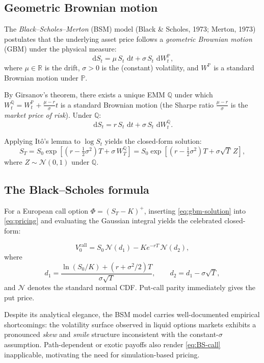 \documentclass[12pt, a4paper]{report}
\theoremstyle{definition}
\newcommand{\Q}{\mathbb{Q}}
\newcommand{\R}{\mathbb{R}}
\newcommand{\dd}{\,\mathrm{d}}
\begin{document}
\subsection{Geometric Brownian motion}

The \emph{Black--Scholes--Merton} (BSM) model (Black \& Scholes, 1973;
Merton, 1973) postulates that the underlying asset price follows a
\emph{geometric Brownian motion} (GBM) under the physical measure:
\[
  \dd S_t = \mu\, S_t\, \dd t + \sigma\, S_t\, \dd W_t^{\mathbb{P}},
\]
where $\mu \in \R$ is the drift, $\sigma > 0$ is the (constant)
volatility, and $W^{\mathbb{P}}$ is a standard Brownian motion under
$\mathbb{P}$.

By Girsanov's theorem, there exists a unique EMM $\Q$ under which
$W_t^{\Q} = W_t^{\mathbb{P}} + \frac{\mu - r}{\sigma}t$ is a standard
Brownian motion (the Sharpe ratio $\frac{\mu-r}{\sigma}$ is the
\emph{market price of risk}).  Under $\Q$:
\[
  \dd S_t = r\, S_t\, \dd t + \sigma\, S_t\, \dd W_t^{\Q}.
\]

Applying Itô's lemma to $\log S_t$ yields the closed-form solution:
\begin{equation}
  S_T = S_0 \exp\!\left[\left(r - \tfrac{1}{2}\sigma^2\right)T
      + \sigma\, W_T^{\Q}\right]
      = S_0 \exp\!\left[\left(r - \tfrac{1}{2}\sigma^2\right)T
      + \sigma\sqrt{T}\,Z\right],
  \label{eq:gbm-solution}
\end{equation}
where $Z \sim \mathcal{N}(0,1)$ under $\Q$.

\subsection{The Black--Scholes formula}

For a European call option $\Phi = (S_T - K)^+$, inserting
\eqref{eq:gbm-solution} into \eqref{eq:pricing} and evaluating the
Gaussian integral yields the celebrated closed-form:

\begin{equation}
  V_0^{\text{call}} = S_0\,\mathcal{N}(d_1) - K e^{-rT}\,\mathcal{N}(d_2),
  \label{eq:BS-call}
\end{equation}
where
\[
  d_1 = \frac{\ln(S_0/K) + (r + \sigma^2/2)T}{\sigma\sqrt{T}}, \qquad
  d_2 = d_1 - \sigma\sqrt{T},
\]
and $\mathcal{N}$ denotes the standard normal CDF.  Put-call parity
immediately gives the put price.

Despite its analytical elegance, the BSM model carries well-documented
empirical shortcomings: the volatility surface observed in liquid options
markets exhibits a pronounced \emph{skew} and \emph{smile} structure
inconsistent with the constant-$\sigma$ assumption.  Path-dependent or
exotic payoffs also render \eqref{eq:BS-call} inapplicable, motivating
the need for simulation-based pricing.
\end{document}
